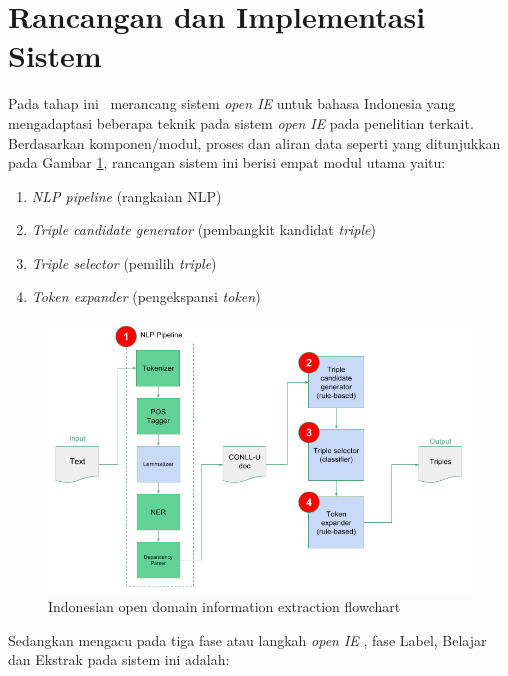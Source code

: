 \section{Rancangan dan Implementasi Sistem}

Pada tahap ini \saya~merancang sistem \textit{open IE} untuk bahasa Indonesia yang mengadaptasi beberapa teknik pada sistem \textit{open IE} pada penelitian terkait. Berdasarkan komponen/modul, proses dan aliran data seperti yang ditunjukkan pada Gambar \ref{fig:program_flowchart}, rancangan sistem ini berisi empat modul utama yaitu: 

\begin{enumerate}
	\item \textit{NLP pipeline} (rangkaian NLP)
	\item \textit{Triple candidate generator} (pembangkit kandidat \textit{triple})
	\item \textit{Triple selector} (pemilih \textit{triple})
	\item \textit{Token expander} (pengekspansi \textit{token})
\end{enumerate}

\begin{figure}
	\centering
	\includegraphics[width=\textwidth]{../images/program_flowchart.png}
	\caption{Indonesian open domain information extraction flowchart}
	\label{fig:program_flowchart}
\end{figure}

Sedangkan mengacu pada tiga fase atau langkah \textit{open IE} \citep{etzioni2011open}, fase Label, Belajar dan Ekstrak pada sistem ini adalah:

